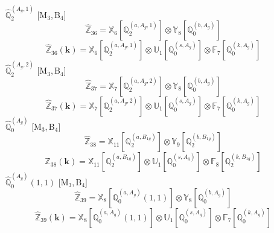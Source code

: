 \documentclass[fleqn,10pt,landscape]{article}
\begin{document}
\begin{itemize}
\vspace{4mm}
\noindent {} $\,\,\,\hat{\mathbb{Q}}_{2}^{(A_{g},1)}$ [M$_{3}$,\,B$_{4}$]
\begin{dmath*}
\hat{\mathbb{Z}}_{36}=\mathbb{X}_{6}[\mathbb{Q}_{2}^{(a,A_{g},1)}] \otimes\mathbb{Y}_{8}[\mathbb{Q}_{0}^{(b,A_{g})}]
\end{dmath*}
\begin{dmath*}
\hat{\mathbb{Z}}_{36}(\bm{k})=\mathbb{X}_{6}[\mathbb{Q}_{2}^{(a,A_{g},1)}] \otimes\mathbb{U}_{1}[\mathbb{Q}_{0}^{(s,A_{g})}] \otimes\mathbb{F}_{7}[\mathbb{Q}_{0}^{(k,A_{g})}]
\end{dmath*}
\vspace{4mm}
\noindent {} $\,\,\,\hat{\mathbb{Q}}_{2}^{(A_{g},2)}$ [M$_{3}$,\,B$_{4}$]
\begin{dmath*}
\hat{\mathbb{Z}}_{37}=\mathbb{X}_{7}[\mathbb{Q}_{2}^{(a,A_{g},2)}] \otimes\mathbb{Y}_{8}[\mathbb{Q}_{0}^{(b,A_{g})}]
\end{dmath*}
\begin{dmath*}
\hat{\mathbb{Z}}_{37}(\bm{k})=\mathbb{X}_{7}[\mathbb{Q}_{2}^{(a,A_{g},2)}] \otimes\mathbb{U}_{1}[\mathbb{Q}_{0}^{(s,A_{g})}] \otimes\mathbb{F}_{7}[\mathbb{Q}_{0}^{(k,A_{g})}]
\end{dmath*}
\vspace{4mm}
\noindent {} $\,\,\,\hat{\mathbb{Q}}_{0}^{(A_{g})}$ [M$_{3}$,\,B$_{4}$]
\begin{dmath*}
\hat{\mathbb{Z}}_{38}=\mathbb{X}_{11}[\mathbb{Q}_{2}^{(a,B_{1g})}] \otimes\mathbb{Y}_{9}[\mathbb{Q}_{2}^{(b,B_{1g})}]
\end{dmath*}
\begin{dmath*}
\hat{\mathbb{Z}}_{38}(\bm{k})=\mathbb{X}_{11}[\mathbb{Q}_{2}^{(a,B_{1g})}] \otimes\mathbb{U}_{1}[\mathbb{Q}_{0}^{(s,A_{g})}] \otimes\mathbb{F}_{8}[\mathbb{Q}_{2}^{(k,B_{1g})}]
\end{dmath*}
\vspace{4mm}
\noindent {} $\,\,\,\hat{\mathbb{Q}}_{0}^{(A_{g})}(1,1)$ [M$_{3}$,\,B$_{4}$]
\begin{dmath*}
\hat{\mathbb{Z}}_{39}=\mathbb{X}_{8}[\mathbb{Q}_{0}^{(a,A_{g})}(1,1)] \otimes\mathbb{Y}_{8}[\mathbb{Q}_{0}^{(b,A_{g})}]
\end{dmath*}
\begin{dmath*}
\hat{\mathbb{Z}}_{39}(\bm{k})=\mathbb{X}_{8}[\mathbb{Q}_{0}^{(a,A_{g})}(1,1)] \otimes\mathbb{U}_{1}[\mathbb{Q}_{0}^{(s,A_{g})}] \otimes\mathbb{F}_{7}[\mathbb{Q}_{0}^{(k,A_{g})}]
\end{dmath*}

\end{itemize}
\end{document}
